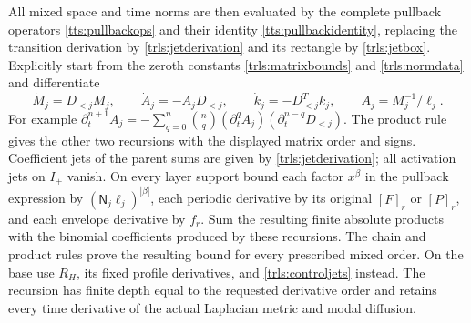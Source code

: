 All mixed space and time norms are then evaluated by the complete
pullback operators \eqref{tts:pullbackops} and their identity
\eqref{tts:pullbackidentity}, replacing the transition derivation
by \eqref{trls:jetderivation} and its rectangle by
\eqref{trls:jetbox}. Explicitly start from the zeroth constants
\eqref{trls:matrixbounds} and \eqref{trls:normdata} and
differentiate
\[
 \dot M_j=D_{<j}M_j,\qquad
 \dot A_j=-A_jD_{<j},\qquad
 \dot k_j=-D_{<j}^Tk_j,\qquad A_j=M_j^{-1}/\ell_j.
\]
For example
$\partial_t^{n+1}A_j=-\sum_{q=0}^n\binom nq
(\partial_t^qA_j)(\partial_t^{n-q}D_{<j})$.
The product rule gives the other two recursions with the displayed
matrix order and signs. Coefficient jets of the parent sums are
given by \eqref{trls:jetderivation}; all activation jets on
$I_+$ vanish. On every layer support bound each factor $x^\beta$
in the pullback expression by
$(\mathsf N_j\ell_j)^{|\beta|}$, each periodic derivative
by its original $[F]_r$ or $[P]_r$, and each envelope derivative
by $f_r$. Sum the resulting finite absolute products with the
binomial coefficients produced by these recursions. The chain and
product rules prove the resulting bound for every prescribed mixed
order. On the base use $R_H$, its fixed profile derivatives, and
\eqref{trls:controljets} instead. The recursion has finite depth
equal to the requested derivative order and retains every time
derivative of the actual Laplacian metric and modal diffusion.

